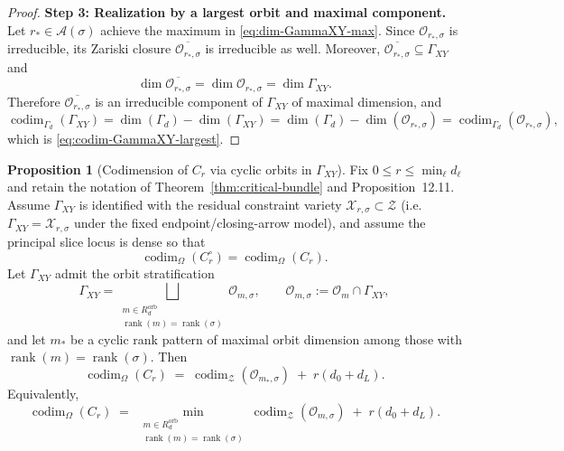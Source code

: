 \documentclass{article}
\newcommand{\rank}{\operatorname{rank}}
\newcommand{\codim}{\operatorname{codim}}
\theoremstyle{definition}
\newtheorem{proposition}[theorem]{Proposition}
\begin{document}
\begin{proof}
\medskip
\noindent\textbf{Step 3: Realization by a largest orbit and maximal component.}
Let $r_\ast\in\mathcal A(\sigma)$ achieve the maximum in \eqref{eq:dim-GammaXY-max}.
Since $\mathcal O_{r_\ast,\sigma}$ is irreducible, its Zariski closure $\overline{\mathcal O_{r_\ast,\sigma}}$ is irreducible as well.
Moreover, $\overline{\mathcal O_{r_\ast,\sigma}}\subseteq \Gamma_{XY}$ and
\[
\dim\overline{\mathcal O_{r_\ast,\sigma}}=\dim \mathcal O_{r_\ast,\sigma}=\dim \Gamma_{XY}.
\]
Therefore $\overline{\mathcal O_{r_\ast,\sigma}}$ is an irreducible component of $\Gamma_{XY}$ of maximal dimension, and
\[
\codim_{\Gamma_d}(\Gamma_{XY})
=
\dim(\Gamma_d)-\dim(\Gamma_{XY})
=
\dim(\Gamma_d)-\dim(\mathcal O_{r_\ast,\sigma})
=
\codim_{\Gamma_d}(\mathcal O_{r_\ast,\sigma}),
\]
which is \eqref{eq:codim-GammaXY-largest}.
\end{proof}
\begin{proposition}[Codimension of $C_r$ via cyclic orbits in $\Gamma_{XY}$]
\label{prop:codim-Cr-via-orbits}
Fix $0\le r\le \min_\ell d_\ell$ and retain the notation of
Theorem~\ref{thm:critical-bundle} and Proposition~12.11.
Assume $\Gamma_{XY}$ is identified with the residual constraint variety
$\mathcal X_{r,\sigma}\subset \mathcal Z$ (i.e.\ $\Gamma_{XY}=\mathcal X_{r,\sigma}$ under the fixed endpoint/closing-arrow model),
and assume the principal slice locus is dense so that
\[
\codim_{\Omega}(C_r^{\circ})=\codim_{\Omega}(C_r).
\]
Let $\Gamma_{XY}$ admit the orbit stratification
\[
\Gamma_{XY}
=
\bigsqcup_{\substack{m\in R^{\mathrm{orb}}_d\\ \rank(m)=\rank(\sigma)}}
\mathcal O_{m,\sigma},
\qquad
\mathcal O_{m,\sigma}:=\mathcal O_m\cap \Gamma_{XY},
\]
and let $m_\ast$ be a cyclic rank pattern of maximal orbit dimension among those with $\rank(m)=\rank(\sigma)$.
Then
\begin{equation}\label{eq:codim-Cr-via-largest-orbit}
\codim_{\Omega}(C_r)
\;=\;
\codim_{\mathcal Z}(\mathcal O_{m_\ast,\sigma})
\;+\;
r(d_0+d_L).
\end{equation}
Equivalently,
\begin{equation}\label{eq:codim-Cr-via-min-orbit}
\codim_{\Omega}(C_r)
\;=\;
\min_{\substack{m\in R^{\mathrm{orb}}_d\\ \rank(m)=\rank(\sigma)}}
\codim_{\mathcal Z}(\mathcal O_{m,\sigma})
\;+\;
r(d_0+d_L).
\end{equation}
\end{proposition}
\end{document}
